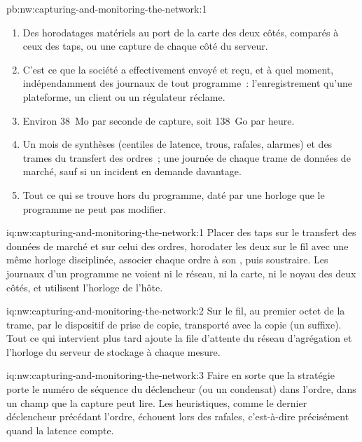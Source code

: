 \begin{solution}{pb:nw:capturing-and-monitoring-the-network:1}
\begin{enumerate}
\item Des horodatages matériels au port de la carte des deux côtés, comparés à ceux des taps, ou une capture de chaque côté du serveur.
\item C'est ce que la société a effectivement envoyé et reçu, et à quel moment, indépendamment des journaux de tout programme~: l'enregistrement qu'une plateforme, un client ou un
  régulateur réclame.
\item Environ 38~Mo par seconde de capture, soit 138~Go par heure.
\item Un mois de synthèses (centiles de latence, trous, rafales, alarmes) et des trames du transfert des ordres~; une journée de chaque trame de données de marché,
  sauf si un incident en demande davantage.
\item Tout ce qui se trouve hors du programme, daté par une horloge que le programme ne peut pas modifier.
\end{enumerate}
\end{solution}

\begin{solution}{iq:nw:capturing-and-monitoring-the-network:1}
Placer des taps sur le transfert des données de marché et sur celui des ordres, horodater les deux sur le fil avec une même horloge disciplinée, associer chaque ordre à son
, puis soustraire. Les journaux d'un programme ne voient ni le réseau, ni la carte, ni le noyau des deux côtés, et utilisent l'horloge de l'hôte.
\end{solution}

\begin{solution}{iq:nw:capturing-and-monitoring-the-network:2}
Sur le fil, au premier octet de la trame, par le dispositif de prise de copie, transporté avec la copie (un suffixe). Tout ce qui intervient plus tard ajoute
la file d'attente du réseau d'agrégation et l'horloge du serveur de stockage à chaque mesure.
\end{solution}

\begin{solution}{iq:nw:capturing-and-monitoring-the-network:3}
Faire en sorte que la stratégie porte le numéro de séquence du déclencheur (ou un condensat) dans l'ordre, dans un champ que la capture peut lire. Les heuristiques, comme le
dernier déclencheur précédant l'ordre, échouent lors des rafales, c'est-à-dire précisément quand la latence compte.
\end{solution}

